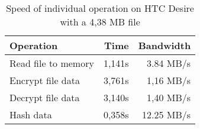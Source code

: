 \begin{table}
  \centering
  \caption{Speed of individual operation on HTC Desire with a 4,38 MB file}
  \begin{tabular}{ | l | r | r |}
    \hline
   \textbf{Operation} & \textbf{Time} & \textbf{Bandwidth} \\ \hline
   Read file to memory  & 1,141s & 3.84 MB/s       \\ \hline
   Encrypt file data    & 3,761s & 1,16 MB/s    \\  \hline
   Decrypt file data    & 3,140s & 1,40 MB/s    \\ \hline
   Hash data            & 0,358s & 12.25 MB/s   \\ \hline
  \end{tabular}
  \label{tbl:desire:pinpoint}
\end{table}
